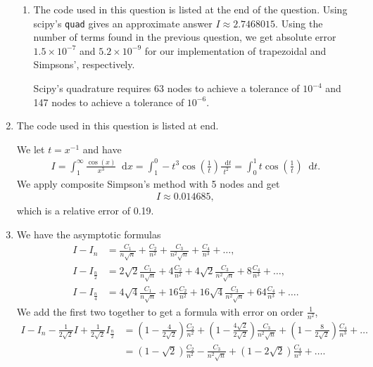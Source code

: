 \documentclass[10pt]{article}
\newcommand*{\dif}{\mathop{}\!\mathrm{d}}
\begin{document}
\begin{enumerate}
\begin{enumerate}
      \item The code used in this question is listed at the end of the question. Using scipy's \texttt{quad} gives an approximate answer \(I \approx 2.7468015\). Using the number of terms found in the previous question, we get absolute error \(1.5\times 10^{-7}\) and \(5.2\times 10^{-9}\) for our implementation of trapezoidal and Simpsons', respectively.

      Scipy's quadrature requires 63 nodes to achieve a tolerance of \(10^{-4}\) and 147 nodes to achieve a tolerance of \(10^{-6}\).

      {\small }
      
    \end{enumerate}

    \newpage
    \item The code used in this question is listed at end.
    
    We let \(t = x^{-1}\) and have \begin{align*}
        I = \int_1^{\infty} \frac{\cos(x)}{x^3}\dif x = \int_1^0 -t^3 \cos \left( \frac{1}{t}\right) \frac{\dif t}{t^2} = \int_0^1 t \cos \left(\frac{1}{t}\right) \dif t.
    \end{align*} We apply composite Simpson's method with 5 nodes and get \begin{align*}
        I \approx 0.014685,
    \end{align*} which is a relative error of 0.19.

    {\small }

    \item We have the asymptotic formulas \begin{align*}
        I-I_n &= \frac{C_1}{n\sqrt{n}} + \frac{C_2}{n^2} + \frac{C_3}{n^2\sqrt{n}} + \frac{C_4}{n^3} + \dots, \\
        I-I_{\frac{n}{2}} &= 2\sqrt{2}\frac{C_1}{n\sqrt{n}} + 4 \frac{C_2}{n^2} + 4\sqrt{2}\frac{C_3}{n^2\sqrt{n}} + 8 \frac{C_4}{n^3} + \dots, \\
        I-I_{\frac{n}{4}} &= 4\sqrt{4} \frac{C_1}{n\sqrt{n}} + 16 \frac{C_2}{n^2} + 16\sqrt{4} \frac{C_3}{n^2\sqrt{n}} + 64 \frac{C_4}{n^3} + \dots. 
    \end{align*} We add the first two together to get a formula with error on order \(\frac{1}{n^2}\), \begin{align*}
        I - I_n - \frac{1}{2\sqrt{2}}I + \frac{1}{2\sqrt{2}}I_{\frac{n}{2}} &= \left( 1 - \frac{4}{2\sqrt{2}} \right) \frac{C_2}{n^2} + \left( 1 - \frac{4\sqrt{2}}{2\sqrt{2}} \right) \frac{C_3}{n^2\sqrt{n}} + \left( 1 - \frac{8}{2\sqrt{2}} \right) \frac{C_4}{n^3} + \dots \\
        &= \left( 1 - \sqrt{2} \right) \frac{C_2}{n^2} - \frac{C_3}{n^2\sqrt{n}} + \left( 1 - 2\sqrt{2} \right) \frac{C_4}{n^3} + \dots.
    \end{align*}


\end{enumerate}
\end{document}

